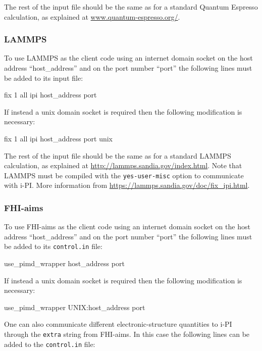 \documentclass[11pt,english,fleqn]{report}
\newenvironment{code}{%
\footnotesize 
\verbatim
}{
\endverbatim
\normalsize
}
\begin{document}
The rest of the input file should be the same as for a standard Quantum
Espresso calculation, as explained at \url{www.quantum-espresso.org/}.

\subsubsection{LAMMPS}

To use LAMMPS as the client code using an 
internet domain socket on the host
address {}``host\_address'' and on the port number {}``port''
the following lines must be added to its input file:

\begin{code}
fix  1 all ipi host_address port
\end{code}

If instead a unix domain socket is required then the following
modification is necessary:

\begin{code}
fix 1  all ipi host_address port unix
\end{code}

The rest of the input file should be the same as for a standard LAMMPS 
calculation, as explained at \url{http://lammps.sandia.gov/index.html}.
Note that LAMMPS must be compiled with the \texttt{yes-user-misc} option
to communicate with i-PI. More information from \url{https://lammps.sandia.gov/doc/fix_ipi.html}.

\subsubsection{FHI-aims}

To use FHI-aims as the client code using an
internet domain socket on the host
address {}``host\_address'' and on the port number {}``port''
the following lines must be added to its \texttt{control.in} file:

\begin{code}
use_pimd_wrapper host_address port
\end{code}

If instead a unix domain socket is required then the following
modification is necessary:

\begin{code}
use_pimd_wrapper UNIX:host_address port
\end{code}

One can also communicate different electronic-structure quantities to i-PI
through the {\small{\tt extra}} string from FHI-aims. In this case the following lines
can be added to the {\tt control.in} file:
\end{document}
